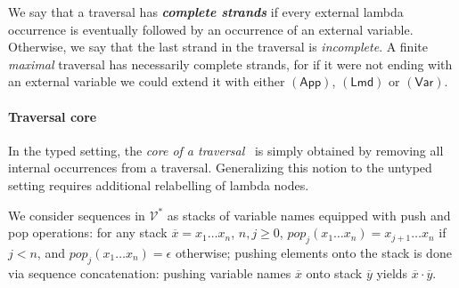 \documentclass[xchauthor,chkrefs,GCNS,amsmath,amsthm,rotating,leaveRGB]{tcsg}
\renewcommand{\index}[1]{}
\theoremstyle{plain}
\theoremstyle{definition}
\newcommand{\VarSet}{\mathcal{V}}
\begin{document}
We say that a traversal has \textbf{\emph{complete strands}}\index{complete
strands} if every external lambda occurrence is eventually followed by an
occurrence of an external variable. Otherwise, we say that the last strand in
the traversal is \emph{incomplete}. A finite \emph{maximal} traversal has
necessarily complete strands, for if it were not ending with an external
variable we could extend it with either $\mathsf{(App)}$, $\mathsf{(Lmd)}$ or
$\mathsf{(Var)}$.

\paragraph*{Traversal core}
In the typed setting, the \emph{core of a traversal}~\cite{BlumPhd} is simply
obtained by removing all internal occurrences from a traversal. Generalizing
this notion to the untyped setting requires additional relabelling of lambda
nodes.

We consider sequences in $\VarSet ^{*}$ as stacks of variable names equipped
with  push and pop operations: for any stack $\overline{x} = x_{1} \ldots
x_{n}$, $n,j\geq 0$, $pop_{j} (x_{1} \ldots x_{n}) = x_{j+1} \ldots x_{n}$ if
$j<n$, and $pop_{j} (x_{1} \ldots x_{n}) = \epsilon $ otherwise; pushing
elements onto the stack is done via sequence concatenation: pushing  variable
names $\overline{x}$ onto stack $\overline{y}$ yields  $\overline{x} \cdot
\overline{y}$.
\end{document}
